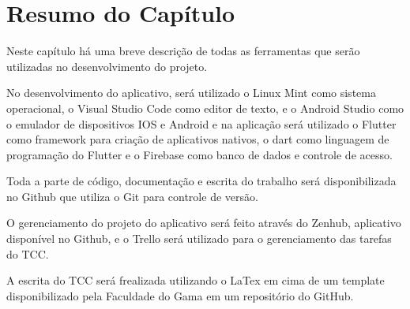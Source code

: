 \section{Resumo do Capítulo}

Neste capítulo há uma breve descrição de todas as ferramentas que serão utilizadas no desenvolvimento do projeto. 

No desenvolvimento do aplicativo, será utilizado o Linux Mint como sistema operacional, o Visual Studio Code como editor de texto, e o Android Studio como o emulador de dispositivos IOS e Android e na aplicação será utilizado o Flutter como framework para criação de aplicativos nativos, o dart como linguagem de programação do Flutter e o Firebase como banco de dados e controle de acesso. 

Toda a parte de código, documentação e escrita do trabalho será disponibilizada no Github que utiliza o Git para controle de versão.

O gerenciamento do projeto do aplicativo será feito através do Zenhub, aplicativo disponível no Github, e o Trello será utilizado para o gerenciamento das tarefas do TCC. 

A escrita do TCC será frealizada utilizando o LaTex em cima de um template disponibilizado pela Faculdade do Gama em um repositório do GitHub. 

